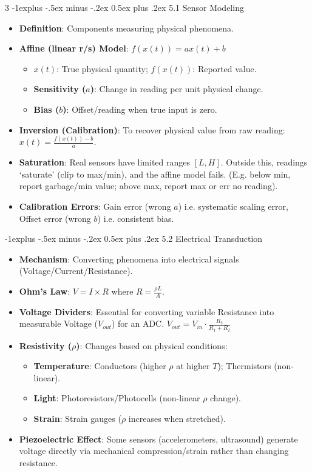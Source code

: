 \documentclass[a4paper, 9pt, landscape]{extarticle}
\makeatletter
\renewcommand{\subsection}{\@startsection{subsection}{2}{0mm}%
                                {-1explus -.5ex minus -.2ex}%
                                {0.5ex plus .2ex}%
                                {\normalfont\normalsize\bfseries}}
\makeatother
\begin{document}
\begin{multicols*}{3}
\subsection{5.1 Sensor Modeling}
\begin{itemize}
  \item \textbf{Definition}: Components measuring physical phenomena.
  \item \textbf{Affine (linear r/s) Model}: $f(x(t)) = ax(t) + b$
  \begin{itemize}
    \item $x(t)$: True physical quantity; $f(x(t))$: Reported value.
    \item \textbf{Sensitivity ($a$)}: Change in reading per unit physical change.
    \item \textbf{Bias ($b$)}: Offset/reading when true input is zero.
  \end{itemize}
  \item \textbf{Inversion (Calibration)}: To recover physical value from raw reading: $x(t) = \frac{f(x(t)) - b}{a}$.
  \item \textbf{Saturation}: Real sensors have limited ranges $[L, H]$. Outside this, readings `saturate' (clip to max/min), and the affine model fails. (E.g. below min, report garbage/min value; above max, report max or err no reading).
  \item \textbf{Calibration Errors}: Gain error (wrong $a$) i.e. systematic scaling error, Offset error (wrong $b$) i.e. consistent bias.
\end{itemize}

\subsection{5.2 Electrical Transduction}
\begin{itemize}
  \item \textbf{Mechanism}: Converting phenomena into electrical signals (Voltage/Current/Resistance).
  \item \textbf{Ohm's Law}: $V = I \times R$ where $R = \frac{\rho L}{A}$.
  \item \textbf{Voltage Dividers}: Essential for converting variable Resistance into measurable Voltage ($V_{out}$) for an ADC. $V_{out} = V_{in} \cdot \frac{R_2}{R_1 + R_2}$
  \item \textbf{Resistivity ($\rho$)}: Changes based on physical conditions:
    \begin{itemize}
      \item \textbf{Temperature}: Conductors (higher $\rho$ at higher $T$); Thermistors (non-linear).
      \item \textbf{Light}: Photoresistors/Photocells (non-linear $\rho$ change).
      \item \textbf{Strain}: Strain gauges ($\rho$ increases when stretched).
    \end{itemize}
  \item \textbf{Piezoelectric Effect}: Some sensors (accelerometers, ultrasound) generate voltage directly via mechanical compression/strain rather than changing resistance.
\end{itemize}


\end{multicols*}
\end{document}
